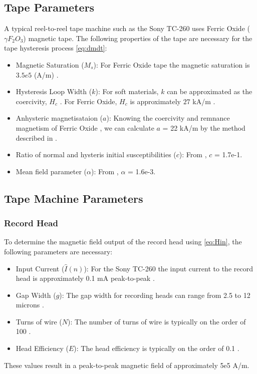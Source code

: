 \documentclass[twoside,a4paper]{article}
\begin{document}
\subsection {Tape Parameters}
A typical reel-to-reel tape machine such as the Sony TC-260 uses 
Ferric Oxide ($\gamma F_2O_3$) magnetic tape. The following
properties of the tape are necessary for the tape hysteresis
process \cref{eq:dmdt}:
\begin{itemize}
\item Magnetic Saturation ($M_s$): For Ferric Oxide tape
the magnetic saturation is $3.5e5$ (A/m) \cite{jilesBook}.
\item Hysteresis Loop Width ($k$): For soft materials, $k$ can be approximated
as the coercivity, $H_c$ \cite{Jiles1992}. For Ferric Oxide, $H_c$ is approximately
$27$ kA/m \cite{jilesBook}.
\item Anhysteric magnetisataion ($a$): Knowing the coercivity and remnance magnetism of Ferric Oxide
\cite{jilesBook}, we can calculate $a$ = 22  kA/m by the method described in
\cite{Jiles1992}.
\item Ratio of normal and hysteris initial susceptibilities ($c$): From \cite{Jiles1992}, $c$ = 1.7e-1.
\item Mean field parameter ($\alpha$): From \cite{Jiles1992}, $\alpha$ = 1.6e-3.
\end{itemize}

\subsection{Tape Machine Parameters}
\subsubsection {Record Head}
To determine the magnetic field output of the
record head using \cref{eq:Hin}, the following parameters 
are necessary:
\begin{itemize}
\item Input Current ($\hat{I} (n)$): For the Sony TC-260
the input current to the record head is approximately
0.1 mA peak-to-peak \cite{RefManual}.
\item Gap Width ($g$): The gap width for recording heads
can range from 2.5 to 12 microns \cite{Kadis}.
\item Turns of wire ($N$): The number of turns of wire
is typically on the order of 100 \cite{1994tmr..book.....B}.
\item Head Efficiency ($E$): The head efficiency is typically
on the order of 0.1 \cite{1994tmr..book.....B}.
\end{itemize}
%
These values result in a peak-to-peak magnetic field
of approximately 5e5 A/m.
\end{document}
